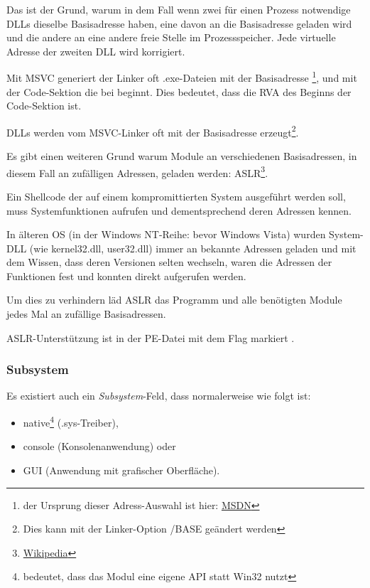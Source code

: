 Das ist der Grund, warum in dem Fall wenn zwei für einen Prozess notwendige DLLs
dieselbe Basisadresse haben, eine davon an die Basisadresse geladen wird und die
andere an eine andere freie Stelle im Prozessspeicher. Jede virtuelle Adresse der
zweiten DLL wird korrigiert.

\par Mit \ac{MSVC} generiert der Linker oft .exe-Dateien mit der Basisadresse
\footnote{der Ursprung dieser Adress-Auswahl ist hier: \href{http://go.yurichev.com/17041}{MSDN}},
und mit der Code-Sektion die bei  beginnt.
Dies bedeutet, dass die \ac{RVA} des Beginns der Code-Sektion  ist.

DLLs werden vom MSVC-Linker oft mit der Basisadresse 
erzeugt\footnote{Dies kann mit der Linker-Option /BASE geändert werden}.


Es gibt einen weiteren Grund warum Module an verschiedenen Basisadressen, in diesem
Fall an zufälligen Adressen, geladen werden: \ac{ASLR}\footnote{\href{http://go.yurichev.com/17140}{Wikipedia}}.


Ein Shellcode der auf einem kompromittierten System ausgeführt werden soll, muss
Systemfunktionen aufrufen und dementsprechend deren Adressen kennen.

In älteren \ac{OS} (in der \gls{Windows NT}-Reihe: bevor Windows Vista) wurden
System-DLL (wie kernel32.dll, user32.dll) immer an bekannte Adressen geladen und
mit dem Wissen, dass deren Versionen selten wechseln, waren die Adressen der Funktionen
fest und konnten direkt aufgerufen werden.

Um dies zu verhindern läd \ac{ASLR} das Programm und alle benötigten Module jedes
Mal an zufällige Basisadressen.

\ac{ASLR}-Unterstützung ist in der PE-Datei mit dem Flag
 markiert .

\subsubsection{Subsystem}

Es existiert auch ein \emph{Subsystem}-Feld, dass normalerweise wie folgt ist:


\begin{itemize}
\item native\footnote{bedeutet, dass das Modul eine eigene API statt Win32 nutzt} (.sys-Treiber),

\item console (Konsolenanwendung) oder

\item \ac{GUI} (Anwendung mit grafischer Oberfläche).
\end{itemize}

